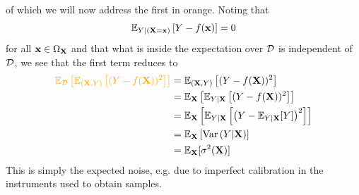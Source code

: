 \documentclass[11pt]{article}
\begin{document}
of which we will now address the first in orange. Noting that
$$
\mathbb{E}_{Y|(\mathbf{X}=\mathbf{x})}\left[Y-f(\mathbf{x})\right]
=
0
$$
for all $\mathbf{x}\in\Omega_{\mathbf{X}}$ and that what is inside the expectation over $\mathcal{D}$ is independent of $\mathcal{D}$, we see that the first term reduces to
\begin{align*}
    \textcolor{myYellow}{\E_{\D}\l[\E_{(\X,Y)}\l[(Y-f(\X))^2\r]\r]}
    &=
    \E_{(\X,Y)}\l[(Y-f(\X))^2\r]\\
    &=
    \E_\X\l[\E_{Y|\X}\l[(Y-f(\X))^2\r]\r]\\
    &=
    \E_\X\l[\E_{Y|\X}\l[\l(Y-\E_{Y|\X}[Y]\r)^2\r]\r]\\
    &=
    \E_\X\l[\text{Var}\l(Y|\X\r)\r]\\
    &=
    \E_\X[\sigma^2(\X)]
\end{align*}
This is simply the expected noise, e.g. due to imperfect calibration in the instruments used to obtain samples.
\end{document}
